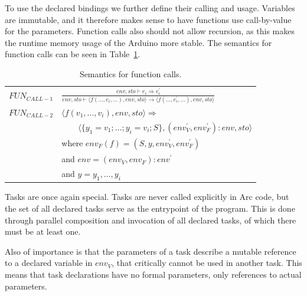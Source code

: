 To use the declared bindings we further define their calling and usage. Variables are immutable, and it therefore makes sense to have functions use call-by-value for the parameters. Function calls also should not allow recursion, as this makes the runtime memory usage of the Arduino more stable. The semantics for function calls can be seen in Table~\ref{tab:functioncalls}.


\begin{table}[htb!]
    \centering
    \begin{tabular}{ll}
        \toprule
        $FUN_{CALL-1}$ & $\frac
            {env, sto \vdash e_i \Rightarrow e^\prime_i}
            {env, sto \vdash \langle f(\dots, e_i, \dots), env,sto \rangle \rightarrow \langle f(\dots, e^\prime_i, \dots), env, sto \rangle}$ \\ [12pt]
        $FUN_{CALL-2}$ & $\langle f(v_1,\dots,v_i), env, sto \rangle \Rightarrow$                                                              \\
                       & $\qquad \langle \{y_1 = v_1;\dots;y_i = v_i; S\}, (env^\prime_V, env^\prime_F):env, sto \rangle$                      \\ [12pt]

                       & where $env_F(f) = (S, y, env^\prime_V, env^\prime_F)$                                                                 \\
                       & and $env = (env_V, env_F) : env^\prime $                                                                              \\
                       & and $y = y_1,\dots,y_i$                                                                                               \\
        \bottomrule
    \end{tabular}
    \caption{Semantics for function calls.}
    \label{tab:functioncalls}
\end{table}


Tasks are once again special. Tasks are never called explicitly in Arc code, but the set of all declared tasks serve as the entrypoint of the program. This is done through parallel composition and invocation of all declared tasks, of which there must be at least one.

Also of importance is that the parameters of a task describe a mutable reference to a declared variable in $env_V$, that critically cannot be used in another task. This means that task declarations have no formal parameters, only references to actual parameters.

